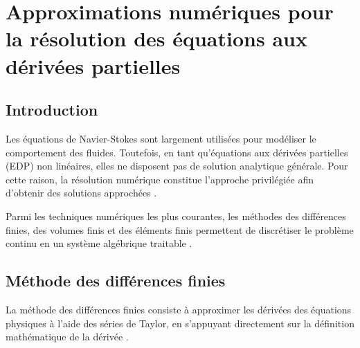 \chapter{Approximations numériques pour la résolution des équations aux dérivées partielles}
\label{chap:approximations_numeriques}

\section{Introduction}
\label{sec:introduction_approx}

Les équations de Navier-Stokes sont largement utilisées pour modéliser le comportement des fluides. Toutefois, en tant qu'équations aux dérivées partielles (EDP) non linéaires, elles ne disposent pas de solution analytique générale. Pour cette raison, la résolution numérique constitue l'approche privilégiée afin d'obtenir des solutions approchées \cite{hirsch2007numerical}.

Parmi les techniques numériques les plus courantes, les méthodes des différences finies, des volumes finis et des éléments finis permettent de discrétiser le problème continu en un système algébrique traitable \cite{tannehill1997computational}.

\section{Méthode des différences finies}
\label{sec:differences_finies}

La méthode des différences finies consiste à approximer les dérivées des équations physiques à l'aide des séries de Taylor, en s'appuyant directement sur la définition mathématique de la dérivée \cite{smith1985numerical}.

